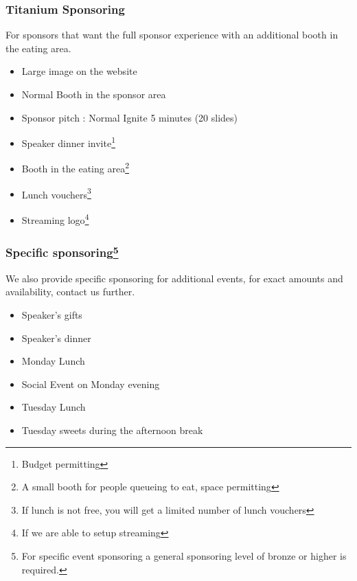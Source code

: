 \begin{frame}
\frametitle{Titanium Sponsoring}
For sponsors that want the full sponsor experience with an additional booth in the eating area.
\begin{itemize}
	\item<+->
	Large image on the website
	\item<+->
	Normal Booth in the sponsor area
	\item<+->
	Sponsor pitch : Normal Ignite 5 minutes (20 slides)
	\item<+->
	Speaker dinner invite\footnote{Budget permitting}
	\item<+->
	Booth in the eating area\footnote{A small booth for people queueing to eat, space permitting}
	\item<+->
	Lunch vouchers\footnote{If lunch is not free, you will get a limited number of lunch vouchers}
	\item<+->
	Streaming logo\footnote{If we are able to setup streaming}
\end{itemize}
\end{frame}


\begin{frame}
\frametitle{Specific sponsoring\footnote{For specific event sponsoring a general sponsoring level of bronze or higher is required.}}
We also provide specific sponsoring for additional events, for exact amounts and availability, contact us further.
\begin{itemize}
	\item<+->
	Speaker's gifts
	\item<+->
	Speaker's dinner
	\item<+->
	Monday Lunch
	\item<+->
	Social Event on Monday evening
	\item<+->
	Tuesday Lunch
	\item<+->
	Tuesday sweets during the afternoon break
\end{itemize}
\end{frame}

